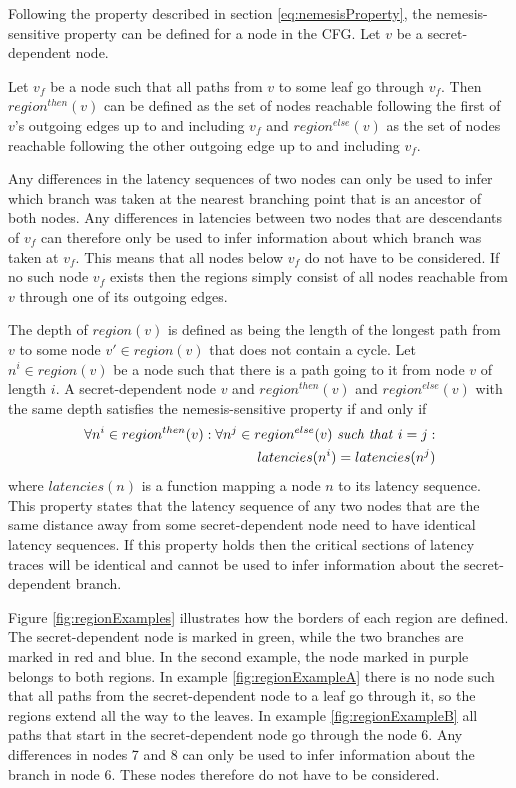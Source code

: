 Following the property described in section \ref{eq:nemesisProperty}, the nemesis-sensitive property can be defined for a node in the CFG. Let $v$ be a secret-dependent node. 

Let $v_f$ be a node such that all paths from $v$ to some leaf go through $v_f$. Then $region^{then}(v)$ can be defined as the set of nodes reachable following the 
first of $v$'s outgoing edges up to and including $v_f$ and $region^{else}(v)$ as the set of nodes reachable following the other outgoing edge up to and including $v_f$.

Any differences in the latency sequences of two nodes can only be used to infer which branch was taken at the nearest branching point that is an ancestor of both nodes. 
Any differences in latencies between two nodes that are descendants of $v_f$ can therefore only be used to infer information about which branch was taken at $v_f$. 
This means that all nodes below $v_f$ do not have to be considered. If no such node $v_f$ exists then the regions simply consist of all nodes reachable from $v$ through one of its outgoing edges. 

The depth of $region(v)$ is defined as being the length of the longest path from $v$ to some node $v' \in region(v)$ that does not contain a cycle.
Let $n^i \in region(v)$ be a node such that there is a path going to it from node $v$ of length $i$. 
A secret-dependent node $v$ and $region^{then}(v)$ and $region^{else}(v)$ with the same depth satisfies the nemesis-sensitive property if and only if 
\begin{equation} \label{eq:nemesisPropertyNode}
    \begin{split}
    \forall n^i \in region^{then}(v) : \forall n^j \in region^{else}(v) \text{ \textit{such that} } i=j :  \\ 
    latencies(n^i) = latencies(n^j)
    \end{split}
\end{equation}
where $latencies(n)$ is a function mapping a node $n$ to its latency sequence. This property states that the latency sequence of any two nodes that are the same distance away 
from some secret-dependent node need to have identical latency sequences. If this property holds then the critical sections of latency traces will be identical and cannot be used to 
infer information about the secret-dependent branch. 

Figure \ref{fig:regionExamples} illustrates how the borders of each region are defined. The secret-dependent node is marked in green, while the two branches are marked in red and blue. In the second example, the node marked in purple belongs to both regions. In example \ref{fig:regionExampleA} there is no node such that all paths from the secret-dependent node to a leaf go through it, so the regions extend all the way to the leaves. In example \ref{fig:regionExampleB} all paths that start in the secret-dependent node go through the node 6. Any differences in nodes 7 and 8 can only be used to infer information about the branch in node 6. These nodes therefore do not have to be considered.  


